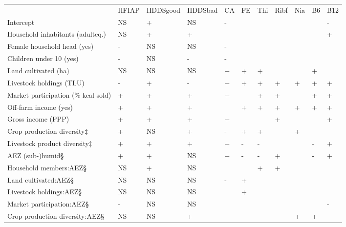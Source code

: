 \documentclass{scrbook}
\begin{document}
\begin{table}
\begin{tabularx}{\textwidth}{
p{}
p{}
p{}
p{}
p{}
p{}
p{}
p{}
p{}
p{}
p{}}
 & HFIAP & HDDSgood & HDDSbad & CA & FE & Thi & Ribf & Nia & B6 & B12 \\
Intercept & NS & + & NS & - & & & & & & - \\
Household inhabitants (adulteq.) & NS & + & + & & & & & & & + \\
Female household head (yes) & - & NS & NS & - & & & & & & \\
Children under 10 (yes) & - & NS & - & - & & & & & & \\
Land cultivated (ha) & NS & NS & NS & + & + & + & & & + & \\
Livestock holdings (TLU) & - & + & - & + & + & + & + & + & + & + \\
Market participation (\% kcal sold) & + & + & + & + & & + & + & & + & + \\
Off-farm income (yes) & + & + & + & & + & + & + & + & + & + \\
Gross income (PPP) & + & + & + & + & & & + & & & + \\
Crop production diversity${\ddag}$ & + & NS & + & - & + & + & & + & & \\
Livestock product diversity${\ddag}$ & + & + & + & + & - & - & & & - & + \\
AEZ (sub-)humid{\S} & + & + & NS & + & - & - & + & & - & + \\
Household members:AEZ{\S} & NS & + & NS & & & + & + & & & \\
Land cultivated:AEZ{\S} & NS & NS & NS & - & + & & & & & \\
Livestock holdings:AEZ{\S} & NS & NS & NS & & + & & & & & \\
Market participation:AEZ{\S} & - & NS & NS & & & & & & & - \\
Crop production diversity:AEZ{\S} & NS & NS & + & & & & & + & + & \\
\end{tabularx}
\end{table}
\end{document}
